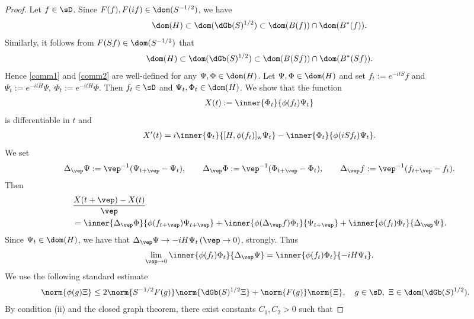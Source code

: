 \documentclass[12pt,draft]{article}
\theoremstyle{plain}
\numberwithin{equation}{section}
\theoremstyle{remark}
\begin{document}
\begin{proof}
Let $f\in\sD$.
Since $F(f), F(if)\in\dom(S^{-1/2})$, we have
\begin{equation}\label{dominc1}
 \dom(H)\subset\dom(\dGb(S)^{1/2}) \subset \dom(B(f)) \cap \dom(B^*(f)).
\end{equation}
Similarly, it follows from $F(Sf)\in\dom(S^{-1/2})$ that
\begin{equation}\label{dominc2}
 \dom(H)\subset\dom(\dGb(S)^{1/2}) \subset \dom(B(Sf)) \cap \dom(B^*(Sf)).
\end{equation}
Hence \eqref{comm1} and \eqref{comm2} are well-defined for any $\Psi,\Phi\in\dom(H)$.
Let $\Psi,\Phi\in\dom(H)$ and set 
$f_t:=e^{-itS}f$ and $\Psi_t:=e^{-itH}\Psi,~\Phi_t:=e^{-itH}\Phi$.
Then $f_t\in\sD$ and $\Psi_t, \Phi_t\in \dom(H)$.
We show that the function
\begin{align*}
  X(t) := \inner{\Phi_t}{\phi(f_t)\Psi_t}
\end{align*}
is differentiable in $t$ and
\begin{align}
 X'(t) 
 = i\inner{\Phi_t}{[H,\phi(f_t)]_\mathrm{w}\Psi_t}
   -\inner{\Phi_t}{\phi(iSf_t)\Psi_t}.   \label{eq:X'}
\end{align}
We set
\begin{align*}
\Delta_\vep\Psi := \vep^{-1}(\Psi_{t+\vep}-\Psi_t), \qquad
\Delta_\vep\Phi := \vep^{-1}(\Phi_{t+\vep}-\Phi_t), \qquad 
\Delta_\vep f := \vep^{-1}(f_{t+\vep}-f_t).
\end{align*}
Then
\begin{align*}
& \frac{X(t+\vep)-X(t)}{\vep} \\
& = \inner{\Delta_\vep\Phi}{\phi(f_{t+\vep})\Psi_{t+\vep}}
 + \inner{\phi(\Delta_\vep f)\Phi_t}{\Psi_{t+\vep}}
 + \inner{\phi(f_t)\Phi_t}{\Delta_\vep\Psi}.
\end{align*}
Since $\Psi_t\in\dom(H)$, 
we have that $\Delta_\vep\Psi\to -iH\Psi_t \, (\vep\to 0)$, strongly. Thus
\begin{align}
\lim_{\vep\to 0} \inner{\phi(f_t)\Phi_t}{\Delta_\vep\Psi}
 =\inner{\phi(f_t)\Phi_t}{-iH\Psi_t}.   \label{eqqxx1}
\end{align}
We use the following standard estimate
\begin{align}
& \norm{\phi(g)\Xi} \leq 2\norm{S^{-1/2}F(g)}  \norm{\dGb(S)^{1/2}\Xi}
  + \norm{F(g)} \norm{\Xi},
  \quad g\in\sD, ~ \Xi \in \dom(\dGb(S)^{1/2}). \label{stdineq}
\end{align}
By condition (ii) and the closed graph theorem, there exist constants $C_1,C_2>0$ such that 

\end{proof}
\end{document}
